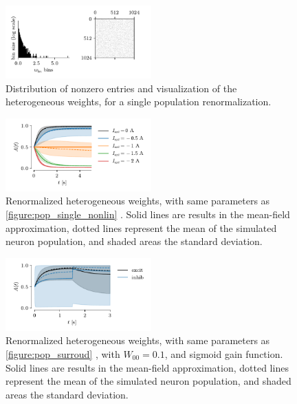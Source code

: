 \documentclass[10pt,conference,compsocconf,a4paper]{IEEEtran}
\newcommand*{\shortautoref}[1]{%
	\begingroup
	\def\equationautorefname{\textsc{Eq.}}%
	\def\tableautorefname{\textsc{Tab.}}%
	\def\figureautorefname{\textsc{Fig.}}%
	\autoref{#1}%
	\endgroup
}
\begin{document}
			\begin{figure}
				\centering
				\includegraphics[width=0.5\textwidth]{figures/pop_renorm_hetero_distribution.pdf}
				\caption{Distribution of nonzero entries and visualization of the heterogeneous weights, for a single population renormalization.}
				\label{figure:pop_renorm_hetero_distribution}
			\end{figure}

			\begin{figure}
				\centering
				\includegraphics[width=0.5\textwidth]{figures/pop_renorm_hetero_single.pdf}
				\caption{Renormalized heterogeneous weights, with same parameters as \shortautoref{figure:pop_single_nonlin}. Solid lines are results in the mean-field approximation, dotted lines represent the mean of the simulated neuron population, and shaded areas the standard deviation.}
				\label{figure:pop_renorm_hetero_single}
			\end{figure}

			\begin{figure}
				\centering
				\includegraphics[width=0.5\textwidth]{figures/pop_renorm_hetero_ei.pdf}
				\caption{Renormalized heterogeneous weights, with same parameters as \shortautoref{figure:pop_surroud}, with $W_{00}=0.1$, and sigmoid gain function. Solid lines are results in the mean-field approximation, dotted lines represent the mean of the simulated neuron population, and shaded areas the standard deviation.}
				\label{figure:pop_renorm_hetero_ei}
			\end{figure}
\end{document}
